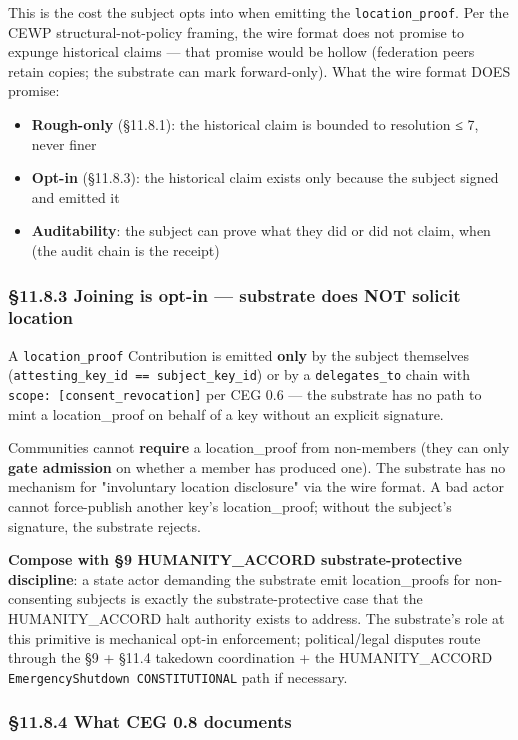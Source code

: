 \documentclass[10pt]{article}
\begin{document}
This is the cost the subject opts into when emitting the \texttt{location\_proof}. Per the CEWP structural-not-policy framing, the wire format does not promise to expunge historical claims — that promise would be hollow (federation peers retain copies; the substrate can mark forward-only). What the wire format DOES promise:


\begin{itemize}\setlength\itemsep{0pt}
\item \textbf{Rough-only} (§11.8.1): the historical claim is bounded to resolution ≤ 7, never finer
\item \textbf{Opt-in} (§11.8.3): the historical claim exists only because the subject signed and emitted it
\item \textbf{Auditability}: the subject can prove what they did or did not claim, when (the audit chain is the receipt)
\end{itemize}


\subsubsection*{§11.8.3 Joining is opt-in — substrate does NOT solicit location}


A \texttt{location\_proof} Contribution is emitted \textbf{only} by the subject themselves (\texttt{attesting\_key\_id == subject\_key\_id}) or by a \texttt{delegates\_to} chain with \texttt{scope: [consent\_revocation]} per CEG 0.6 — the substrate has no path to mint a location\_proof on behalf of a key without an explicit signature.


Communities cannot \textbf{require} a location\_proof from non-members (they can only \textbf{gate admission} on whether a member has produced one). The substrate has no mechanism for "involuntary location disclosure" via the wire format. A bad actor cannot force-publish another key's location\_proof; without the subject's signature, the substrate rejects.


\textbf{Compose with §9 HUMANITY\_ACCORD substrate-protective discipline}: a state actor demanding the substrate emit location\_proofs for non-consenting subjects is exactly the substrate-protective case that the HUMANITY\_ACCORD halt authority exists to address. The substrate's role at this primitive is mechanical opt-in enforcement; political/legal disputes route through the §9 + §11.4 takedown coordination + the HUMANITY\_ACCORD \texttt{EmergencyShutdown CONSTITUTIONAL} path if necessary.


\subsubsection*{§11.8.4 What CEG 0.8 documents}
\end{document}
